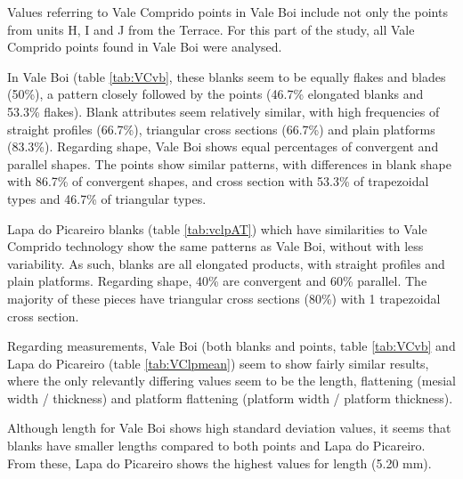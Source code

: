\documentclass[12pt,twoside]{reedthesis}
\begin{document}
Values referring to Vale Comprido points in Vale Boi include not only the points from units H, I and J from the Terrace. For this part of the study, all Vale Comprido points found in Vale Boi were analysed.

In Vale Boi (table \ref{tab:VCvb}, these blanks seem to be equally flakes and blades (50\%), a pattern closely followed by the points (46.7\% elongated blanks and 53.3\% flakes). Blank attributes seem relatively similar, with high frequencies of straight profiles (66.7\%), triangular cross sections (66.7\%) and plain platforms (83.3\%). Regarding shape, Vale Boi shows equal percentages of convergent and parallel shapes. The points show similar patterns, with differences in blank shape with 86.7\% of convergent shapes, and cross section with 53.3\% of trapezoidal types and 46.7\% of triangular types.

Lapa do Picareiro blanks (table \ref{tab:vclpAT}) which have similarities to Vale Comprido technology show the same patterns as Vale Boi, without with less variability. As such, blanks are all elongated products, with straight profiles and plain platforms. Regarding shape, 40\% are convergent and 60\% parallel. The majority of these pieces have triangular cross sections (80\%) with 1 trapezoidal cross section.

Regarding measurements, Vale Boi (both blanks and points, table \ref{tab:VCvb} and Lapa do Picareiro (table \ref{tab:VClpmean}) seem to show fairly similar results, where the only relevantly differing values seem to be the length, flattening (mesial width / thickness) and platform flattening (platform width / platform thickness).

Although length for Vale Boi shows high standard deviation values, it seems that blanks have smaller lengths compared to both points and Lapa do Picareiro. From these, Lapa do Picareiro shows the highest values for length (5.20 mm).
\end{document}
